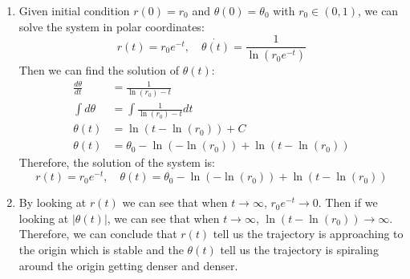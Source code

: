 \documentclass[12pt]{exam}
\begin{document}
\begin{enumerate}
	\item Given initial condition $r(0)=r_0$ and $\theta(0)=\theta_0$ with $r_0 \in (0,1)$, we can solve the system in polar coordinates:
					\[ r(t) = r_0e^{-t}, \quad \dot{\theta(t)} = \frac{1}{\ln(r_0e^{-t})} \]
	Then we can find the solution of $\theta(t)$:
	\begin{align*}
		\frac{d\theta}{dt} &= \frac{1}{\ln(r_0)-t} \\
		\int d\theta &= \int \frac{1}{\ln(r_0)-t} dt \\
		\theta(t) &= \ln(t-\ln(r_0))+C \\
		\theta(t) &= \theta_0-\ln(-\ln(r_0)) + \ln(t-\ln(r_0)) 
	\end{align*}
	Therefore, the solution of the system is:
	\[ r(t) = r_0e^{-t}, \quad \theta(t) = \theta_0-\ln(-\ln(r_0)) + \ln(t-\ln(r_0)) \]
	
	\item By looking at $r(t)$ we can see that when $t \to \infty$, $r_0e^{-t} \to 0$. Then if we looking at $|\theta(t)|$, we can see that when $t \to \infty$, $\ln(t-\ln(r_0)) \to \infty$. Therefore, we can conclude that $r(t)$ tell us the trajectory is approaching to the origin which is stable and the $\theta(t)$ tell us the trajectory is spiraling around the origin getting denser and denser. 

\end{enumerate}
\end{document}

